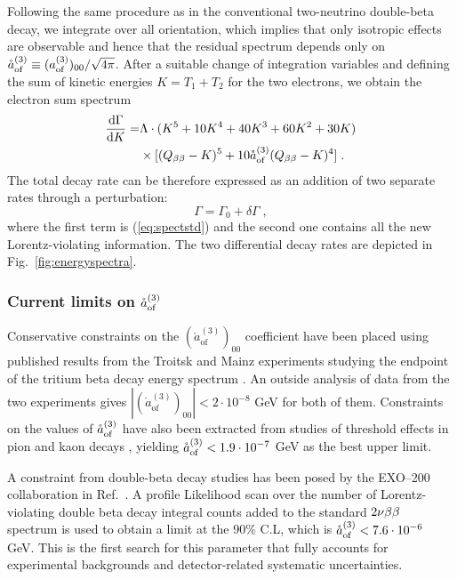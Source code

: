  Following the same procedure as in the conventional two-neutrino double-beta decay, we integrate over all orientation, which implies that only isotropic effects are observable and hence that the residual spectrum depends only on $\mathring{a}_\text{of}^{(3)}\equiv(a_\text{of}^{(3)})_{00}/\sqrt{4\pi}$. After a suitable change of integration variables and defining the sum of kinetic energies $K=T_1+T_2$ for the two electrons, we obtain the electron sum spectrum
\begin{equation}
	\begin{split}
	\frac{\text{d}\Gamma}{\text{d}K} =& \Lambda \cdot(K^5+10K^4+40K^3+60K^2+30K) \\
									  & \times[(Q_{\beta\beta}-K)^5+10\mathring{a}_\text{of}^{(3)}(Q_{\beta\beta}-K)^4]\;. \\
	\end{split}\label{eq:totwidth}
\end{equation}
The total decay rate can be therefore expressed as an addition of two separate rates through a perturbation:
\begin{equation}\Gamma=\Gamma_0+\delta\Gamma\;,\end{equation}
where the first term is (\ref{eq:spectstd}) and the second one contains all the new Lorentz-violating information. The two differential decay rates are depicted in Fig.~\ref{fig:energyspectra}.

\subsubsection*{Current limits on $\mathring{a}_\text{of}^{(3)}$}
Conservative constraints on the $(\mathring{a}^{(3)}_\text{of})_{00}$ coefficient have been placed using published results from the Troitsk and Mainz experiments studying the endpoint of the tritium beta decay energy spectrum \cite{Diaz:2013saa}. An outside analysis of data from the two experiments gives $|(\mathring{a}^{(3)}_\text{of})_{00}|<2\cdot10^{-8}$ GeV for both of them. Constraints on the values of $\mathring{a}_\text{of}^{(3)}$ have also been extracted from studies of threshold effects in pion and kaon decays \cite{SMEneutrinos}, yielding $\mathring{a}_\text{of}^{(3)}<1.9\cdot10^{-7}$ GeV as the best upper limit.

A constraint from double-beta decay studies has been posed by the EXO--200 collaboration in Ref.~\cite{exo200}. A profile Likelihood scan over the number of Lorentz-violating double beta decay integral counts added to the standard $2\nu\beta\beta$ spectrum is used to obtain a limit at the 90\% C.L, which is $\mathring{a}_\text{of}^{(3)}<7.6\cdot10^{-6}$ GeV. This is the first search for this parameter that fully accounts for experimental backgrounds and detector-related systematic uncertainties.
